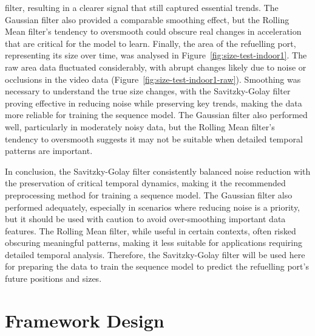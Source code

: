 \documentclass[12pt,oneside]{book} %
\begin{document}
filter, resulting in a clearer signal that still captured essential trends. The
Gaussian filter also provided a comparable smoothing effect, but the Rolling
Mean filter’s tendency to oversmooth could obscure real changes in acceleration
that are critical for the model to learn. Finally, the area of the refuelling
port, representing its size over time, was analysed in
Figure~\ref{fig:size-test-indoor1}. The raw area data fluctuated considerably,
with abrupt changes likely due to noise or occlusions in the video data
(Figure~\ref{fig:size-test-indoor1-raw}). Smoothing was necessary to understand
the true size changes, with the Savitzky-Golay filter proving effective in
reducing noise while preserving key trends, making the data more reliable for
training the sequence model. The Gaussian filter also performed well,
particularly in moderately noisy data, but the Rolling Mean filter’s tendency
to oversmooth suggests it may not be suitable when detailed temporal patterns
are important.

In conclusion, the Savitzky-Golay filter consistently balanced noise reduction
with the preservation of critical temporal dynamics, making it the recommended
preprocessing method for training a sequence model. The Gaussian filter also
performed adequately, especially in scenarios where reducing noise is a
priority, but it should be used with caution to avoid over-smoothing important
data features. The Rolling Mean filter, while useful in certain contexts, often
risked obscuring meaningful patterns, making it less suitable for applications
requiring detailed temporal analysis. Therefore, the Savitzky-Golay filter will
be used here for preparing the data to train the sequence model to predict the
refuelling port’s future positions and sizes.

\section{Framework Design}
\end{document}
